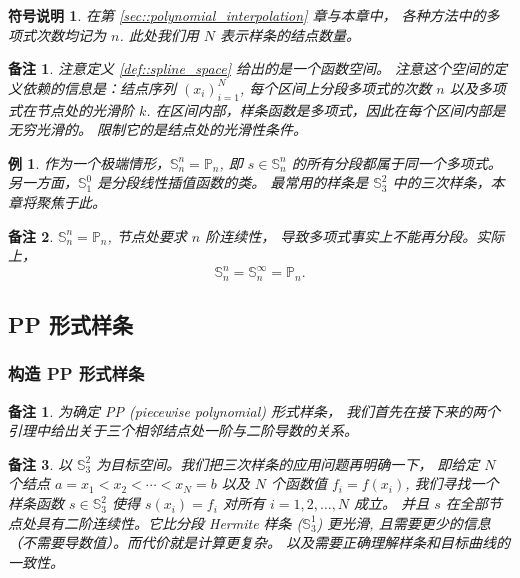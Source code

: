 \documentclass[a4paper]{ctexart}
\newtheorem{remark}{备注}
\newtheorem*{remark*}{备注}
\newtheorem{notation}{符号说明}
\newtheorem{example}[theorem]{例}
\numberwithin{theorem}{section}
\numberwithin{equation}{section}
\numberwithin{figure}{section}
\numberwithin{remark}{section}
\begin{document}
\begin{notation}
在第 \ref{sec::polynomial_interpolation} 章与本章中，
各种方法中的多项式次数均记为 $n$. 此处我们用 $N$ 表示样条的结点数量。
\end{notation}

\begin{remark*}
    注意定义 \ref{def::spline_space} 给出的是一个函数空间。
    注意这个空间的定义依赖的信息是：结点序列 $(x_i)_{i=1}^{N}$, 
    每个区间上分段多项式的次数 $n$ 以及多项式在节点处的光滑阶 $k$.
    在区间内部，样条函数是多项式，因此在每个区间内部是无穷光滑的。
    限制它的是结点处的光滑性条件。
\end{remark*}

\begin{example}
作为一个极端情形，$\mathbb{S}_n^{n}=\mathbb{P}_n$, 
即 $s\in \mathbb{S}_n^{n}$ 的所有分段都属于同一个多项式。
另一方面，$\mathbb{S}_1^{0}$ 是分段线性插值函数的类。
最常用的样条是 $\mathbb{S}_3^{2}$ 中的三次样条，本章将聚焦于此。
\end{example}

\begin{remark*}
    $\mathbb{S}_n^{n}=\mathbb{P}_n$, 节点处要求 $n$ 阶连续性，
    导致多项式事实上不能再分段。实际上，
    $$
    \mathbb{S}_n^{n} = \mathbb{S}_n^{\infty} = \mathbb{P}_n.
    $$
\end{remark*}

\subsection{PP 形式样条}
\label{sec::pp_spline}

\subsubsection{构造 PP 形式样条}

\begin{remark}
为确定 PP (piecewise polynomial) 形式样条，
我们首先在接下来的两个引理中给出关于三个相邻结点处一阶与二阶导数的关系。
\end{remark}

\begin{remark*}
    以 $\mathbb{S}_3^2$ 为目标空间。我们把三次样条的应用问题再明确一下，
    即给定 $N$ 个结点 $a = x_1<x_2<\cdots<x_N = b$ 
    以及 $N$ 个函数值 $f_i=f(x_i)$, 
    我们寻找一个样条函数 $s\in \mathbb{S}_3^2$ 使得
    $s(x_i)=f_i$ 对所有 $i=1,2,\ldots,N$ 成立。
    并且 $s$ 在全部节点处具有二阶连续性。它比分段 Hermite 样条 ($\mathbb{S}_3^1$) 
    更光滑, 且需要更少的信息（不需要导数值）。而代价就是计算更复杂。
    以及需要正确理解样条和目标曲线的一致性。
\end{remark*}
\end{document}
